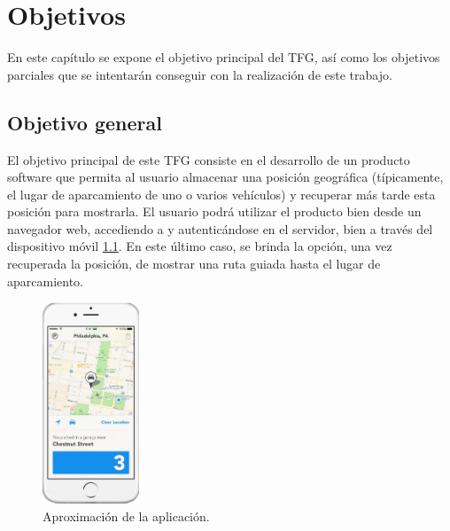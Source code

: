 \chapter{Objetivos}
\label{chap:objetivos}

\noindent
%

En este capítulo se expone el objetivo principal del TFG, así como los objetivos parciales que se intentarán conseguir con la realización de este trabajo.

\section{Objetivo general}

El objetivo principal de este TFG consiste en el desarrollo de un producto software que permita al usuario almacenar una posición geográfica (típicamente, el lugar de aparcamiento de uno o varios vehículos) y recuperar más tarde esta posición para mostrarla. El usuario podrá utilizar el producto bien desde un navegador web, accediendo a y autenticándose en el servidor, bien a través del dispositivo móvil \ref{fig:Preview_App}. En este último caso, se brinda la opción, una vez recuperada la posición, de mostrar una ruta guiada hasta el lugar de aparcamiento.

\begin{figure}[hbtp]
\centering
\includegraphics[height=60mm, fbox={\fboxrule} 4mm]{images/objetivos/telefono_parking.jpg}
\caption{Aproximación de la aplicación.}
\label{fig:Preview_App}
\end{figure}

